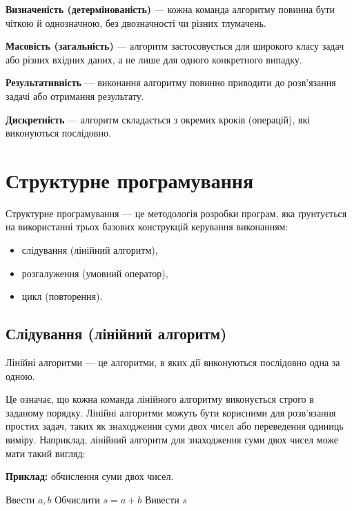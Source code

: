\noindent \textbf{Визначеність (детермінованість)} — кожна команда алгоритму повинна бути чіткою й однозначною, без двозначності чи різних тлумачень.

\noindent \textbf{Масовість (загальність)} — алгоритм застосовується для широкого класу задач або різних вхідних даних, а не лише для одного конкретного випадку.

\noindent \textbf{Результативність} — виконання алгоритму повинно приводити до розв’язання задачі або отримання результату.

\noindent \textbf{Дискретність} — алгоритм складається з окремих кроків (операцій), які виконуються послідовно.


	\section{Структурне програмування}

	Структурне програмування --- це методологія розробки програм, яка ґрунтується 
	на використанні трьох базових конструкцій керування виконанням:
	\begin{itemize}
		\item слідування (лінійний алгоритм),
		\item розгалуження (умовний оператор),
		\item цикл (повторення).
	\end{itemize}
	
	\subsection*{Слідування (лінійний алгоритм)}
 
		\begin{defn}{Лінійні алгоритми — це}
		алгоритми, в яких дії виконуються послідовно одна за одною. 
	\end{defn}

	Це означає, що кожна команда лінійного алгоритму виконується строго в заданому порядку. Лінійні алгоритми можуть бути корисними для розв’язання простих задач, таких як знаходження суми двох чисел або переведення одиниць виміру.
	Наприклад, лінійний алгоритм для знаходження суми двох чисел може мати такий вигляд:
	
	\textbf{Приклад:} обчислення суми двох чисел.

\begin{tcolorbox}[title=Алгоритм: Сума двох чисел]

		\begin{algorithmic}
			\STATE Ввести $a, b$
			\STATE Обчислити $s = a + b$
			\STATE Вивести $s$
		\end{algorithmic}

\end{tcolorbox}
	
